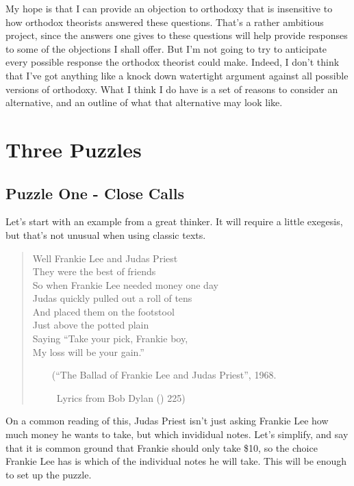 \documentclass[
  10pt,
  letterpaper,
  DIV=11,
  numbers=noendperiod,
  twoside]{scrartcl}
\begin{document}
My hope is that I can provide an objection to orthodoxy that is
insensitive to how orthodox theorists answered these questions. That's a
rather ambitious project, since the answers one gives to these questions
will help provide responses to some of the objections I shall offer. But
I'm not going to try to anticipate every possible response the orthodox
theorist could make. Indeed, I don't think that I've got anything like a
knock down watertight argument against all possible versions of
orthodoxy. What I think I do have is a set of reasons to consider an
alternative, and an outline of what that alternative may look like.

\section{Three Puzzles}\label{three-puzzles}

\subsection{Puzzle One - Close Calls}\label{puzzle-one---close-calls}

Let's start with an example from a great thinker. It will require a
little exegesis, but that's not unusual when using classic texts.

\begin{quote}
Well Frankie Lee and Judas Priest\\
They were the best of friends\\
So when Frankie Lee needed money one day\\
Judas quickly pulled out a roll of tens\\
And placed them on the footstool\\
Just above the potted plain\\
Saying ``Take your pick, Frankie boy,\\
My loss will be your gain.''\\
\strut ~~~~(``The Ballad of Frankie Lee and Judas Priest'', 1968.\\
\strut ~~~~~Lyrics from Bob Dylan () 225)
\end{quote}

On a common reading of this, Judas Priest isn't just asking Frankie Lee
how much money he wants to take, but which invididual notes. Let's
simplify, and say that it is common ground that Frankie should only take
\$10, so the choice Frankie Lee has is which of the individual notes he
will take. This will be enough to set up the puzzle.
\end{document}
